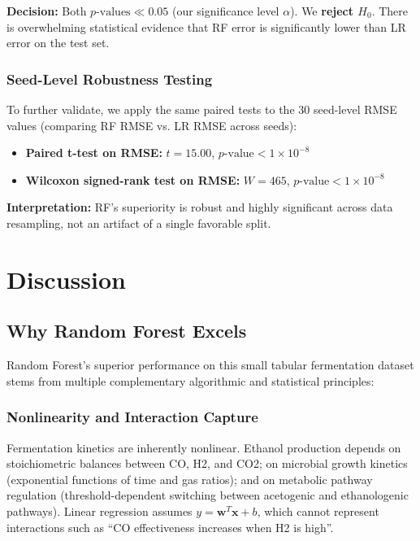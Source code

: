 \documentclass[conference]{IEEEtran}
\begin{document}
\textbf{Decision:} Both $p\text{-values} \ll 0.05$ (our significance level $\alpha$). We \textbf{reject $H_0$}. There is overwhelming statistical evidence that RF error is significantly lower than LR error on the test set.

\subsubsection{Seed-Level Robustness Testing}

To further validate, we apply the same paired tests to the 30 seed-level RMSE values (comparing RF RMSE vs. LR RMSE across seeds):

\begin{itemize}
\item \textbf{Paired t-test on RMSE:} $t = 15.00$, $p\text{-value} < 1 \times 10^{-8}$
\item \textbf{Wilcoxon signed-rank test on RMSE:} $W = 465$, $p\text{-value} < 1 \times 10^{-8}$
\end{itemize}

\textbf{Interpretation:} RF's superiority is robust and highly significant across data resampling, not an artifact of a single favorable split.

\section{Discussion}

\subsection{Why Random Forest Excels}
Random Forest's superior performance on this small tabular fermentation dataset stems from multiple complementary algorithmic and statistical principles:

\subsubsection{Nonlinearity and Interaction Capture}
Fermentation kinetics are inherently nonlinear. Ethanol production depends on stoichiometric balances between CO, H2, and CO2; on microbial growth kinetics (exponential functions of time and gas ratios); and on metabolic pathway regulation (threshold-dependent switching between acetogenic and ethanologenic pathways). Linear regression assumes $y = \mathbf{w}^T \mathbf{x} + b$, which cannot represent interactions such as ``CO effectiveness increases when H2 is high''. 
\end{document}
